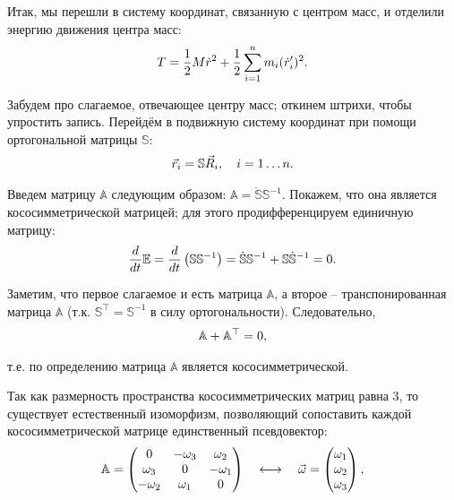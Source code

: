 \documentclass[12pt]{article}
\begin{document}
Итак, мы перешли в систему координат, связанную с центром масс, и отделили энергию движения центра масс:
\vspace*{-0.1cm}
\begin{gather}
T = \frac{1}{2} M \dot{r}^2 + \frac{1}{2} \sum_{i=1}^{n} m_i( \dot{r}_i^\prime)^2. \notag
\end{gather}

Забудем про слагаемое, отвечающее центру масс; откинем штрихи, чтобы упростить запись.
Перейдём в подвижную систему координат при помощи ортогональной матрицы $\mathbb{S}$:
\vspace*{-0.1cm}
\begin{gather}
\vec{r}_i = \mathbb{S} \vec{R}_i, \quad i = 1 \dots n. \notag
\end{gather}

Введем матрицу $\mathbb{A}$ следующим образом: $\mathbb{A} = \dot{\mathbb{S}} \mathbb{S}^{-1}$. Покажем, что она является кососимметрической матрицей; для этого продифференцируем единичную матрицу:
\vspace*{-0.1cm}
\begin{gather}
\frac{d}{dt} \mathbb{E} = \frac{d}{dt} \left( \mathbb{S} \mathbb{S}^{-1}\right) = \dot{\mathbb{S}} \mathbb{S}^{-1} + \mathbb{S} \dot{\mathbb{S}}^{-1} = 0. \notag
\end{gather}

Заметим, что первое слагаемое и есть матрица $\mathbb{A}$, а второе -- транспонированная матрица $\mathbb{A}$ (т.к. $\mathbb{S}^\top = \mathbb{S}^{-1}$ в силу ортогональности). Следовательно,
\vspace*{-0.1cm}
\begin{gather}
\mathbb{A} + \mathbb{A}^\top = 0, \notag
\end{gather}

\hspace*{-0.75cm} т.е. по определению матрица $\mathbb{A}$ является кососимметрической.

Так как размерность пространства кососимметрических матриц равна 3, то существует естественный изоморфизм, позволяющий сопоставить каждой кососимметрической матрице единственный псевдовектор:
\vspace*{-0.1cm}
\begin{gather}
\mathbb{A} = 
\begin{pmatrix}
0 & -\omega_3 & \omega_2 \\
\omega_3 & 0 & -\omega_1 \\
-\omega_2 & \omega_1 & 0
\end{pmatrix}
\quad
\longleftrightarrow
\quad
\vec{\omega} = 
\begin{pmatrix}
\omega_1 \\
\omega_2 \\
\omega_3
\end{pmatrix}
,
\notag
\end{gather}
\end{document}
